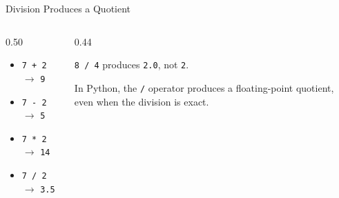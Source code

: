 \documentclass[aspectratio=169,10pt]{beamer}
\begin{document}
\begin{frame}{Division Produces a Quotient}

  \begin{columns}[T,onlytextwidth]

    \begin{column}{0.50\textwidth}

      \begin{itemize}

        \item \texttt{7 + 2} $\rightarrow$ \texttt{9}

        \item \texttt{7 - 2} $\rightarrow$ \texttt{5}

        \item \texttt{7 * 2} $\rightarrow$ \texttt{14}

        \item \texttt{7 / 2} $\rightarrow$ \texttt{3.5}

      \end{itemize}

    \end{column}

    \begin{column}{0.44\textwidth}

      \begin{exampleblockcp}

        \texttt{8 / 4} produces \texttt{2.0}, not \texttt{2}.

      \end{exampleblockcp}

      \begin{keyidea}

        In Python, the \texttt{/} operator produces a floating-point quotient, even when the division is exact.

      \end{keyidea}

    \end{column}

  \end{columns}

\end{frame}
\end{document}
